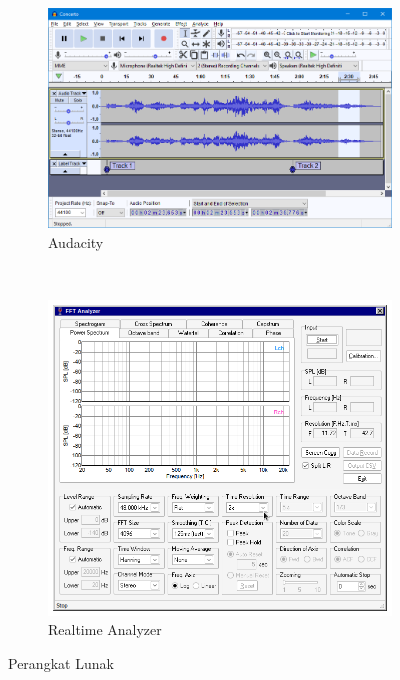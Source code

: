 \documentclass{article}
\begin{document}
\begin{itemize}
		\begin{figure}[H]
			\centering
			\begin{subfigure}[]{.55\textwidth}
				\includegraphics[width=\textwidth]{images/audacity}
				\caption{Audacity}
			\end{subfigure}
			\\
			\begin{subfigure}[]{.55\textwidth}
				\includegraphics[width=\textwidth]{images/rta}
				\caption{Realtime Analyzer}
			\end{subfigure}
			\caption{Perangkat Lunak}
		\end{figure}

	\end{itemize}
\end{document}
